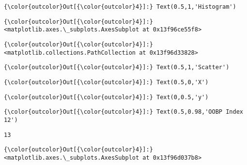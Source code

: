 \documentclass[11pt]{article}
\begin{document}
\begin{Verbatim}[commandchars=\\\{\}]
{\color{outcolor}Out[{\color{outcolor}4}]:} Text(0.5,1,'Histogram')
\end{Verbatim}
            
\begin{Verbatim}[commandchars=\\\{\}]
{\color{outcolor}Out[{\color{outcolor}4}]:} <matplotlib.axes.\_subplots.AxesSubplot at 0x13f96ce55f8>
\end{Verbatim}
            
\begin{Verbatim}[commandchars=\\\{\}]
{\color{outcolor}Out[{\color{outcolor}4}]:} <matplotlib.collections.PathCollection at 0x13f96d33828>
\end{Verbatim}
            
\begin{Verbatim}[commandchars=\\\{\}]
{\color{outcolor}Out[{\color{outcolor}4}]:} Text(0.5,1,'Scatter')
\end{Verbatim}
            
\begin{Verbatim}[commandchars=\\\{\}]
{\color{outcolor}Out[{\color{outcolor}4}]:} Text(0.5,0,'X')
\end{Verbatim}
            
\begin{Verbatim}[commandchars=\\\{\}]
{\color{outcolor}Out[{\color{outcolor}4}]:} Text(0,0.5,'y')
\end{Verbatim}
            
\begin{Verbatim}[commandchars=\\\{\}]
{\color{outcolor}Out[{\color{outcolor}4}]:} Text(0.5,0.98,'OOBP Index 12')
\end{Verbatim}
            
    \begin{Verbatim}[commandchars=\\\{\}]
13

    \end{Verbatim}

\begin{Verbatim}[commandchars=\\\{\}]
{\color{outcolor}Out[{\color{outcolor}4}]:} <matplotlib.axes.\_subplots.AxesSubplot at 0x13f96d037b8>
\end{Verbatim}
            
\end{document}
